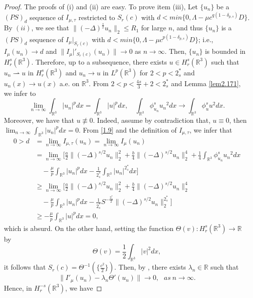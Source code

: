 \documentclass[11pt]{article}
\numberwithin{equation}{section}
\begin{document}
\begin{proof}
The proofs of (i) and (ii) are easy. To prove item (iii), Let
$\{u_n\}$ be a $(PS)_d$ sequence of $I_{\mu, \tau}$ restricted to $S_{r}(c)$
with $d<min\{0, \Lambda-\mu c^{q(1-\delta_{p,s})}D\}$. By $(ii)$, we see that
$\|(-\Delta)^\frac{s}{2}u_n\|_2\leq R_1$ for large $n$, and thus $\{u_n\}$ is a
$(PS)_d$ sequence of $I_{\mu}|_{S_{r}(c)}$ with $d<min\{0,
\Lambda-\mu c^{p(1-\delta_{p,s})}D\}$; i.e.,
$I_{\mu}(u_n)\to d$ and $\|I_{\mu}|'_{S_{r}(c)}(u_n)\|\to 0$ as $n\to \infty$.
Then, $\{u_n\}$ is bounded in $H^s_{r}(\mathbb{R}^3)$. Therefore, up to a
subsequence, there exists $u\in H^s_r(\mathbb{R}^3)$ such that
$u_n\rightharpoonup u$ in $H^s_{r}(\mathbb{R}^3)$ and
$u_n\to u$ in $L^p(\mathbb{R}^3)$ for $2<p<2^*_s$ and
$u_n(x)\to u(x)$ a.e. on $\mathbb{R}^3$.
From $2<p<\frac{4s}{3}+2<2^*_s$ and Lemma \ref{lem2.171}, we infer to
$$
\lim_{n\to \infty}\int_{\mathbb{R}^3}|u_n|^pdx
=\int_{\mathbb{R}^3}|u|^pdx, \quad
\int_{\mathbb{R}^3}\phi^s_{u_n}{u_n}^2dx\to \int_{\mathbb{R}^3}\phi^s_u u^2dx.
$$
Moreover, we have that $u\not\equiv 0$. Indeed, assume by contradiction that,
$u\equiv0$, then $\lim_{n\to \infty}\int_{\mathbb{R}^3}|u_n|^pdx=0$.
From \eqref{1.9} and the definition of $I_{\mu, \tau}$, we infer that
\begin{align*}
0>d
&=\lim_{n\to \infty}I_{\mu, \tau}(u_n)=\lim_{n\to \infty}I_{\mu}(u_n)\\
&=\lim_{n\to \infty}\Big[\frac{a}{2}\|(-\Delta)^{s/2}u_n\|^2_2
 +\frac{b}{4}\|(-\Delta)^{s/2}u_n\|^4_2
 +\frac{1}{4}\int_{\mathbb{R}^3}\phi^s_{u_n}{u_n}^2dx\\
&\quad -\frac{\mu}{p}\int_{\mathbb{R}^3}|u_n|^pdx
 -\frac{1}{2^*_s}\int_{\mathbb{R}^3}|u_n|^{2^*_s}dx\Big]\\
&\geq \lim_{n\to \infty}\Big[\frac{a}{2}\|(-\Delta)^{s/2}u_n\|^2_2+\frac{b}{4}\|(-\Delta)^{s/2}u_n\|^4_2
\\
&\quad -\frac{\mu}{p}\int_{\mathbb{R}^3}|u_n|^pdx
 -\frac{1}{2^*_s}S^{-\frac{2^*_s}{2}}\|(-\Delta)^{s/2}u_n\|^{2^*_s}_2\Big]\\
&\geq -\frac{\mu}{p}\int_{\mathbb{R}^3}|u|^pdx=0,
\end{align*}
which is absurd. On the other hand, setting the function
 $\Theta(v): H^s_{r}(\mathbb{R}^3)\to \mathbb{R}$ by
$$
\Theta(v)=\frac{1}{2}\int_{\mathbb{R}^3}|v|^2dx,
$$
it follows that $S_r(c)=\Theta^{-1}(\{\frac{c^2}{2}\})$.
Then, by \cite[Proposition 5.12]{W6888}, there exists $\lambda_n\in {\mathbb{R}}$
such that
$$
\|I'_\mu(u_n)-\lambda_n\Theta'(u_n)\|\to 0,~~~ as~ n\to \infty.
$$
Hence, in $H^{-s}_{r}(\mathbb{R}^3)$, we have

\end{proof}
\end{document}
